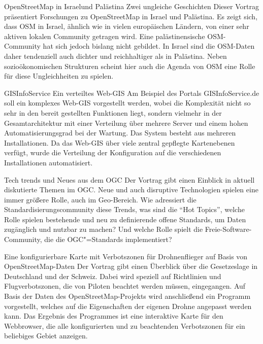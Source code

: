 %
{OpenStreetMap in Israel\linebreak und Palästina\vspace{0.2em}}%
{Zwei ungleiche Geschichten}%
{%
Dieser Vortrag präsentiert Forschungen zu OpenStreetMap in Israel und Palästina. Es zeigt
sich, dass OSM in Israel, ähnlich wie in vielen europäischen Ländern, von einer
sehr aktiven lokalen Community getragen wird. Eine palästinensische
OSM-Community hat sich jedoch bislang nicht gebildet. In Israel sind die
OSM-Daten daher tendenziell auch dichter und reichhaltiger als in Palästina.
Neben sozioökonomischen Strukturen scheint hier auch die Agenda von OSM eine
Rolle für diese Ungleichheiten zu spielen.%
}


%
{GISInfoService}%
{Ein verteiltes Web-GIS}%
{%
Am Beispiel des Portals GISInfoService.de soll ein komplexes Web-GIS
vorgestellt werden, wobei die Komplexität nicht so sehr in den
bereit gestellten Funktionen liegt, sondern vielmehr in der
Gesamtarchitektur mit einer Verteilung über mehrere Server und einem hohen
Automatisierungsgrad bei der Wartung. Das System besteht aus mehreren
Installationen. Da das Web-GIS über viele zentral gepflegte Kartenebenen
verfügt, wurde die Verteilung der Konfiguration auf die verschiedenen
Installationen automatisiert.%
}

%
{Tech trends und Neues aus dem OGC}%
{}%
{%
Der Vortrag gibt einen Einblick in aktuell diskutierte Themen im OGC. Neue und
auch disruptive Technologien spielen eine immer größere Rolle, auch im
Geo-Bereich. Wie adressiert die Standardisierungscommunity diese Trends, was
sind die "`Hot Topics"', welche Rolle spielen bestehende und neu zu
definierende offene Standards, um Daten zugänglich und nutzbar zu machen? Und
welche Rolle spielt die Freie-Software-Community, die die OGC"=Standards
implementiert?%
}

%
{Eine konfigurierbare Karte mit \mbox{Verbotszonen} für Drohnenflieger auf Basis von OpenStreetMap-Daten}%
{}%
{%
Der Vortrag gibt einen Überblick über die Gesetzeslage in Deutschland und der
Schweiz. Dabei wird speziell auf Richtlinien und Flugverbotszonen, die von
Piloten beachtet werden müssen, eingegangen. Auf Basis der Daten des
OpenStreetMap-Projekts wird anschließend ein Programm vorgestellt, welches auf
die Eigenschaften der eigenen Drohne angepasst werden kann. Das Ergebnis des
Programmes ist eine interaktive Karte für den Webbrowser, die alle
konfigurierten und zu beachtenden Verbotszonen für ein beliebiges Gebiet
anzeigen.%
}


